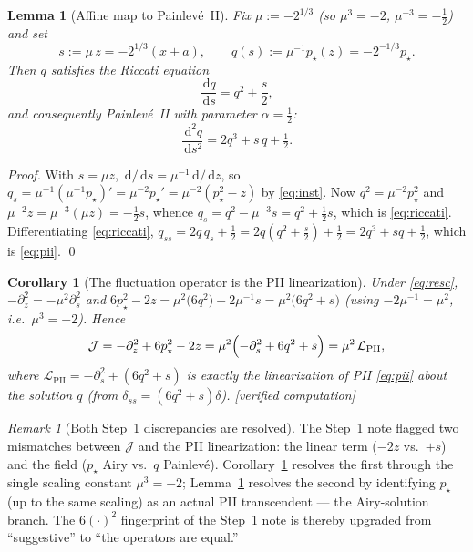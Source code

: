 \documentclass[11pt,reqno]{amsart}
\theoremstyle{plain}
\newtheorem{lemma}[proposition]{Lemma}
\newtheorem{corollary}[proposition]{Corollary}
\theoremstyle{remark}
\newtheorem{remark}[proposition]{Remark}
\newcommand{\dd}{\,\mathrm{d}}
\newcommand{\pinst}{p_\star}
\newcommand{\OK}{{\footnotesize\textsf{[verified computation]}}}
\begin{document}
\begin{lemma}[Affine map to Painlev\'e~II]\label{lem:map}
Fix $\mu:=-2^{1/3}$ (so $\mu^3=-2$, $\mu^{-3}=-\tfrac12$) and set
\begin{equation}\label{eq:resc}
s:=\mu\,z=-2^{1/3}(x+a),\qquad q(s):=\mu^{-1}\pinst(z)=-2^{-1/3}\pinst.
\end{equation}
Then $q$ satisfies the Riccati equation
\begin{equation}\label{eq:riccati}
\frac{\dd q}{\dd s}=q^2+\frac{s}{2},
\end{equation}
and consequently Painlev\'e~II with parameter $\alpha=\tfrac12$:
\begin{equation}\label{eq:pii}
\frac{\dd^2 q}{\dd s^2}=2q^3+s\,q+\tfrac12.
\end{equation}
\end{lemma}

\begin{proof}
With $s=\mu z$, $\dd/\dd s=\mu^{-1}\dd/\dd z$, so
$q_s=\mu^{-1}(\mu^{-1}\pinst)'=\mu^{-2}\pinst'=\mu^{-2}(\pinst^2-z)$ by \eqref{eq:inst}. Now
$q^2=\mu^{-2}\pinst^2$ and $\mu^{-2}z=\mu^{-3}(\mu z)=-\tfrac12 s$, whence
$q_s=q^2-\mu^{-3}s=q^2+\tfrac12 s$, which is \eqref{eq:riccati}. Differentiating \eqref{eq:riccati},
$q_{ss}=2q\,q_s+\tfrac12=2q(q^2+\tfrac{s}{2})+\tfrac12=2q^3+sq+\tfrac12$, which is \eqref{eq:pii}.
\qed
\end{proof}

\begin{corollary}[The fluctuation operator is the PII linearization]\label{cor:linop}
Under \eqref{eq:resc}, $-\partial_z^2=-\mu^2\partial_s^2$ and
$6\pinst^2-2z=\mu^2\bigl(6q^2\bigr)-2\mu^{-1}s=\mu^2\bigl(6q^2+s\bigr)$ (using $-2\mu^{-1}=\mu^2$,
i.e.\ $\mu^3=-2$). Hence
\[
\mathcal J=-\partial_z^2+6\pinst^2-2z=\mu^2\Bigl(-\partial_s^2+6q^2+s\Bigr)=\mu^2\,\mathcal L_{\mathrm{PII}},
\]
where $\mathcal L_{\mathrm{PII}}=-\partial_s^2+(6q^2+s)$ is exactly the linearization of PII
\eqref{eq:pii} about the solution $q$ (from $\delta_{ss}=(6q^2+s)\delta$). \OK
\end{corollary}

\begin{remark}[Both Step~1 discrepancies are resolved]
The Step~1 note flagged two mismatches between $\mathcal J$ and the PII linearization: the linear
term ($-2z$ vs.\ $+s$) and the field ($\pinst$ Airy vs.\ $q$ Painlev\'e). Corollary~\ref{cor:linop}
resolves the first through the single scaling constant $\mu^3=-2$; Lemma~\ref{lem:map} resolves the
second by identifying $\pinst$ (up to the same scaling) as an actual PII transcendent --- the
Airy-solution branch. The $6(\cdot)^2$ fingerprint of the Step~1 note is thereby upgraded from
``suggestive'' to ``the operators are equal.''
\end{remark}
\end{document}
